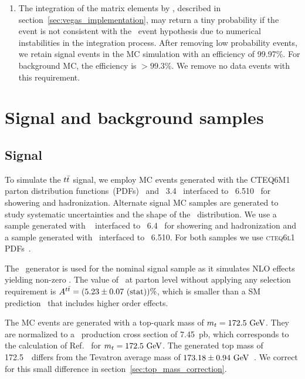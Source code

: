 \documentclass[aps,prd,twocolumn,showpacs,superscriptaddress,groupedaddress,floatfix]{revtex4}
\begin{document}
\begin{enumerate}
\item 
\label{sec:vegas_cut}
The  integration of the matrix elements by \vegas, described in section~\ref{sec:vegas_implementation}, may return a tiny probability if the event is not consistent with the \ttbar\ event hypothesis 
due to
numerical instabilities in the integration process.
After removing low probability events, we retain signal events in the MC simulation with an efficiency of 99.97\%.  For background MC, the efficiency is $>99.3\%$. 
We remove no data events with this requirement.


\end{enumerate}



\section{Signal and background samples}
\label{sec:signall_bsm_background}

\subsection{Signal}
\label{sec:signal_generation}
To simulate the $t\bar{t}$ signal, we employ MC events generated with 
 the {\textsc{CTEQ6M1}}  parton distribution functions~(PDFs)~\cite{Nadolsky:2008zw} and 
\mcatnlo~3.4~\cite{Frixione:2002ik, Frixione:2008ym} interfaced to \herwig~6.510~\cite{Corcella:2000bw} for showering and hadronization. 
Alternate signal MC samples are generated to study systematic uncertainties and the shape of the \dyttbar\ distribution. We use a sample generated with 
\alpgen~\cite{alpgen} interfaced to \pythia~6.4~\cite{pythia} for showering and hadronization and  a sample generated with \alpgen\ interfaced to  \herwig~6.510. For both samples we use  \textsc{cteq6l1} PDFs~\cite{Nadolsky:2008zw}.
 


The \mcatnlo\ generator  is used for the nominal signal sample as it
  simulates NLO effects yielding non-zero \Att.
The value of \Att\ at parton level  without applying any selection requirement is $A^{t\bar t}=(5.23\pm 0.07\text{ (stat)})\%$, which is smaller than a SM prediction~\cite{Czakon:2014xsa} 
that includes higher order effects.
 
The MC events are generated 
with a top-quark mass of $m_t= 172.5~\mathrm{GeV}$.
They are normalized to a \ttbar\ production 
cross section of 7.45~pb, which corresponds to the calculation of Ref.~\cite{Moch:2008qy} for $m_t= 172.5~\mathrm{GeV}$. 
The generated top mass of 172.5~\gev\ differs from the Tevatron
average mass of $173.18\pm0.94~\mathrm{GeV}$~\cite{Aaltonen:2012ra}.
We correct  for this small difference in section~\ref{sec:top_mass_correction}.
\end{document}
